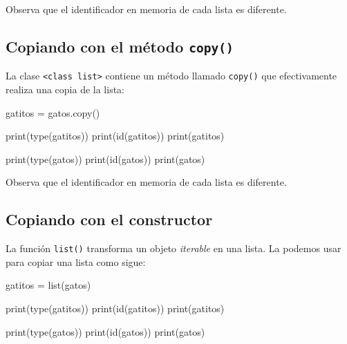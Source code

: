 \documentclass[
  letterpaper,
  DIV=11,
  numbers=noendperiod]{scrreprt}
\newenvironment{Shaded}{\begin{snugshade}}{\end{snugshade}}
\newcommand{\BuiltInTok}[1]{\textcolor[rgb]{0.00,0.23,0.31}{#1}}
\newcommand{\NormalTok}[1]{\textcolor[rgb]{0.00,0.23,0.31}{#1}}
\newcommand{\OperatorTok}[1]{\textcolor[rgb]{0.37,0.37,0.37}{#1}}
\begin{document}
Observa que el identificador en memoria de cada lista es diferente.

\subsection{\texorpdfstring{Copiando con el método
\texttt{copy()}}{Copiando con el método copy()}}\label{copiando-con-el-muxe9todo-copy}

La clase
\texttt{\textless{}class\ \textquotesingle{}list\textquotesingle{}\textgreater{}}
contiene un método llamado \texttt{copy()} que efectivamente realiza una
copia de la lista:

\begin{Shaded}
\begin{Highlighting}[]
\NormalTok{gatitos }\OperatorTok{=}\NormalTok{ gatos.copy()}
\end{Highlighting}
\end{Shaded}

\begin{Shaded}
\begin{Highlighting}[]
\BuiltInTok{print}\NormalTok{(}\BuiltInTok{type}\NormalTok{(gatitos))}
\BuiltInTok{print}\NormalTok{(}\BuiltInTok{id}\NormalTok{(gatitos))}
\BuiltInTok{print}\NormalTok{(gatitos)}

\BuiltInTok{print}\NormalTok{(}\BuiltInTok{type}\NormalTok{(gatos))}
\BuiltInTok{print}\NormalTok{(}\BuiltInTok{id}\NormalTok{(gatos))}
\BuiltInTok{print}\NormalTok{(gatos)}
\end{Highlighting}
\end{Shaded}

Observa que el identificador en memoria de cada lista es diferente.

\subsection{Copiando con el
constructor}\label{copiando-con-el-constructor}

La función \texttt{list()} transforma un objeto \emph{iterable} en una
lista. La podemos usar para copiar una lista como sigue:

\begin{Shaded}
\begin{Highlighting}[]
\NormalTok{gatitos }\OperatorTok{=} \BuiltInTok{list}\NormalTok{(gatos)}
\end{Highlighting}
\end{Shaded}

\begin{Shaded}
\begin{Highlighting}[]
\BuiltInTok{print}\NormalTok{(}\BuiltInTok{type}\NormalTok{(gatitos))}
\BuiltInTok{print}\NormalTok{(}\BuiltInTok{id}\NormalTok{(gatitos))}
\BuiltInTok{print}\NormalTok{(gatitos)}

\BuiltInTok{print}\NormalTok{(}\BuiltInTok{type}\NormalTok{(gatos))}
\BuiltInTok{print}\NormalTok{(}\BuiltInTok{id}\NormalTok{(gatos))}
\BuiltInTok{print}\NormalTok{(gatos)}
\end{Highlighting}
\end{Shaded}
\end{document}
